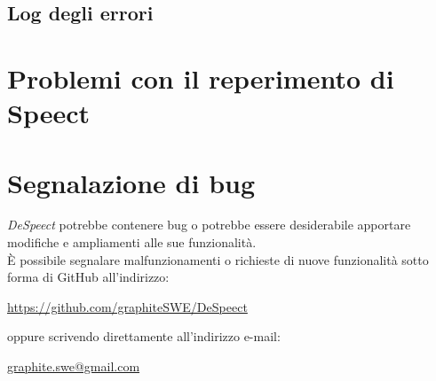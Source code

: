 \documentclass[openany,12pt,a4paper]{report}
\begin{document}
	\subsection{Log degli errori}
	
	\section{Problemi con il reperimento di Speect}
	
	\section{Segnalazione di bug}
	
	\textit{DeSpeect} potrebbe contenere bug o potrebbe essere desiderabile apportare modifiche e ampliamenti alle sue funzionalità. \\ È possibile segnalare malfunzionamenti o richieste di nuove funzionalità sotto forma di GitHub  all’indirizzo:
	\begin{center}
		\url{https://github.com/graphiteSWE/DeSpeect}
	\end{center}
  oppure scrivendo direttamente all'indirizzo e-mail:
  \begin{center}
  	\url{graphite.swe@gmail.com}
  \end{center}
	
	\appendix
	
	\printglossary[style=glossaryStyle, nonumberlist]
	
\end{document}
